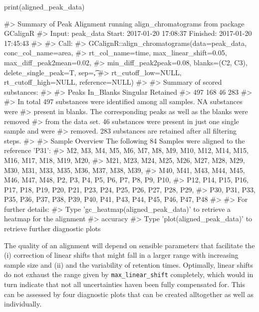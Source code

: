 \begin{Schunk}
\begin{Sinput}
print(aligned_peak_data)
\end{Sinput}
\begin{Soutput}
#>   Summary of Peak Alignment running align_chromatograms from package GCalignR
#>   Input: peak_data   Start:  2017-01-20 17:08:37     Finished:  2017-01-20 17:45:43 
#> 
#> Call:
#>   GCalignR::align_chromatograms(data=peak_data, conc_col_name=area,
#>   rt_col_name=time, max_linear_shift=0.05, max_diff_peak2mean=0.02,
#>   min_diff_peak2peak=0.08, blanks=(C2, C3), delete_single_peak=T, sep=\t,
#>   rt_cutoff_low=NULL, rt_cutoff_high=NULL, reference=NULL)
#> 
#> Summary of scored substances:
#> 
#>     Peaks In_Blanks  Singular  Retained 
#>       497       168        46       283 
#> 
#>   In total 497 substances were identified among all samples. NA substances were
#>   present in blanks. The corresponding peaks as well as the blanks were removed
#>   from the data set. 46 substances were present in just one single sample and were
#>   removed. 283 substances are retained after all filtering steps.
#> 
#> Sample Overview  The following 84 Samples were aligned to the reference 'P31':
#>   M2, M3, M4, M5, M6, M7, M8, M9, M10, M12, M14, M15, M16, M17, M18, M19, M20,
#>   M21, M23, M24, M25, M26, M27, M28, M29, M30, M31, M33, M35, M36, M37, M38, M39,
#>   M40, M41, M43, M44, M45, M46, M47, M48, P2, P3, P4, P5, P6, P7, P8, P9, P10,
#>   P12, P14, P15, P16, P17, P18, P19, P20, P21, P23, P24, P25, P26, P27, P28, P29,
#>   P30, P31, P33, P35, P36, P37, P38, P39, P40, P41, P43, P44, P45, P46, P47, P48
#> 
#> For further details:
#>   Type 'gc_heatmap(aligned_peak_data)' to retrieve a heatmap for the alignment
#>   accuracy
#>   Type 'plot(aligned_peak_data)' to retrieve further diagnostic plots
\end{Soutput}
\end{Schunk}

The quality of an alignment will depend on sensible parameters that
facilitate the (i) correction of linear shifts that might fall in a
larger range with increasing sample size and (ii) and the variability of
retention times. Optimally, linear shifts do not exhaust the range given
by \texttt{max\_linear\_shift} completely, which would in turn indicate
that not all uncertainties haven been fully compensated for. This can be
assessed by four diagnostic plots that can be created alltogether as
well as individually.

